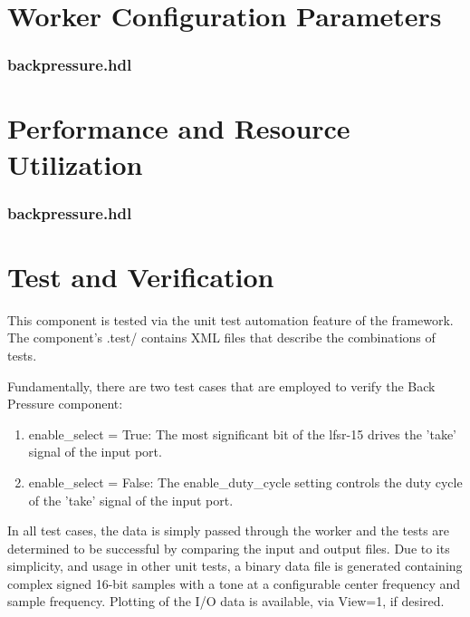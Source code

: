 \documentclass{article}
\def\comp{backpressure}
\edef\ecomp{backpressure}
\begin{document}
\begin{landscape}
\section*{Worker Configuration Parameters}
\subsubsection*{\comp.hdl}

\section*{Performance and Resource Utilization}
\subsubsection*{\comp.hdl}

\end{landscape}

\section*{Test and Verification}
\begin{flushleft}
This component is tested via the unit test automation feature of the framework.  The component's .test/ contains XML files that describe the combinations of tests. \medskip

Fundamentally, there are two test cases that are employed to verify the Back Pressure component:

\begin{enumerate}
	\item enable\_select = True: The most significant bit of the lfsr-15 drives the 'take' signal of the input port.
	\item enable\_select = False: The enable\_duty\_cycle setting controls the duty cycle of the 'take' signal of the input port.
\end{enumerate}

	In all test cases, the data is simply passed through the worker and the tests are determined to be successful by comparing the input and output files. Due to its simplicity, and usage in other unit tests, a binary data file is generated containing complex signed 16-bit samples with a tone at a configurable center frequency and sample frequency. Plotting of the I/O data is available, via View=1, if desired.
\end{flushleft}
\end{document}
